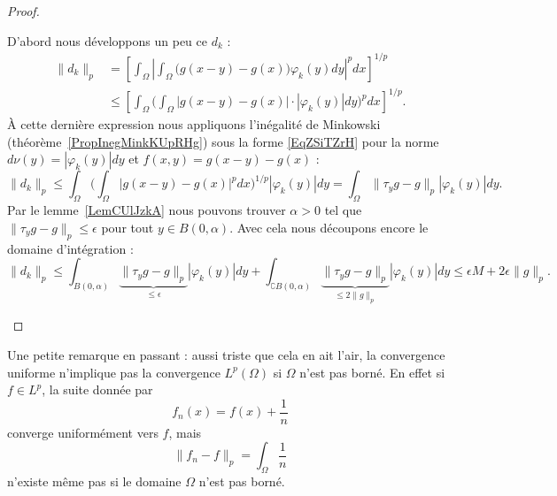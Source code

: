 \begin{proof}
\begin{enumerate}
            D'abord nous développons un peu ce \( d_k\) :
            \begin{subequations}
                \begin{align}
                \| d_k \|_p&=\left[ \int_{\Omega}\left|     \int_{\Omega}\big( g(x-y)-g(x) \big)\varphi_k(y)dy  \right|^pdx \right]^{1/p}\\
                &\leq\left[    \int_{\Omega}\Big( \int_{\Omega}| g(x-y)-g(x) |\cdot |\varphi_k(y) |dy \Big)^pdx \right]^{1/p}.
                \end{align}
            \end{subequations}
            À cette dernière expression nous appliquons l'inégalité de Minkowski (théorème~\ref{PropInegMinkKUpRHg}) sous la forme \eqref{EqZSiTZrH} pour la norme \( d\nu(y)=| \varphi_k(y) |dy\) et \( f(x,y)=g(x-y)-g(x)\) :
            \begin{equation}
                \| d_k \|_p\leq \int_{\Omega}\Big( \int_{\Omega}\big| g(x-y)-g(x) \big|^pdx \Big)^{1/p}| \varphi_k(y) |dy=\int_{\Omega}\| \tau_yg-g \|_p| \varphi_k(y) |dy.
            \end{equation}
            Par le lemme~\ref{LemCUlJzkA} nous pouvons trouver \( \alpha>0\) tel que \( \| \tau_yg-g \|_p\leq \epsilon\) pour tout \( y\in B(0,\alpha)\). Avec cela nous découpons encore le domaine d'intégration :
            \begin{equation}
                \| d_k \|_p\leq \int_{B(0,\alpha)}\underbrace{\| \tau_yg-g \|_p}_{\leq \epsilon}| \varphi_k(y) |dy+\int_{\complement B(0,\alpha)}  \underbrace{\| \tau_yg-g \|_p}_{\leq 2\| g \|_p}| \varphi_k(y) |dy\leq \epsilon M+2\epsilon\| g \|_p.
            \end{equation}
    \end{enumerate}
\end{proof}

Une petite remarque en passant : aussi triste que cela en ait l'air, la convergence uniforme n'implique pas la convergence \( L^p(\Omega)\) si \( \Omega\) n'est pas borné. En effet si \( f\in L^p\), la suite donnée par
\begin{equation}
    f_n(x)=f(x)+\frac{1}{ n }
\end{equation}
converge uniformément vers \( f\), mais
\begin{equation}
    \| f_n-f \|_p=\int_{\Omega}\frac{1}{ n }
\end{equation}
n'existe même pas si le domaine \( \Omega\) n'est pas borné.

